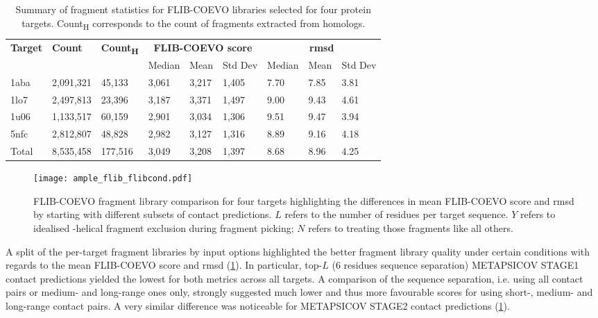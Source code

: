 \begin{table}[H]
  \centering
  \scriptsize
  \caption[FLIB-COEVO fragment characterics across four protein targets]{Summary of fragment statistics for FLIB-COEVO libraries selected for four protein targets. Count\textsubscript{H} corresponds to the count of fragments extracted from homologs.}
  \label{table:ample_flib_frag_summary}
  \begin{tabularx}{\textwidth}{X X X X X X X X X}
      \hline
      \multirow{2}{*}{\textbf{Target}} & \multirow{2}{*}{\textbf{Count}} & \multirow{2}{*}{\textbf{Count\textsubscript{H}}} & \multicolumn{3}{c}{\textbf{FLIB-COEVO score}} & \multicolumn{3}{c}{\textbf{\gls{rmsd}}} \\ \cline{4-9}
      		&			&			& Median 	& Mean 		& Std Dev 	& Median 	& Mean 	& Std Dev \\
      \hline
      1aba	& 2,091,321	& 45,133		& 3,061	& 3,217	& 1,405	& 7.70	& 7.85	& 3.81	\\
	  1lo7	& 2,497,813	& 23,396		& 3,187	& 3,371	& 1,497	& 9.00	& 9.43	& 4.61	\\
      1u06	& 1,133,517	& 60,159		& 2,901	& 3,034	& 1,306	& 9.51	& 9.47	& 3.94	\\
      5nfc	& 2,812,807	& 48,828		& 2,982	& 3,127	& 1,316	& 8.89	& 9.16	& 4.18	\\
      \hline
      Total	& 8,535,458	& 177,516		& 3,049	& 3,208	& 1,397	& 8.68	& 8.96	& 4.25	\\
      \hline
  \end{tabularx}
\end{table}

\begin{figure}[H]
	\centering
	\texttt{[image: ample\_flib\_flibcond.pdf]}
	\caption[FLIB-COEVO fragment library comparison]{FLIB-COEVO fragment library comparison for four targets highlighting the differences in mean FLIB-COEVO score and \gls{rmsd} by starting with different subsets of contact predictions. $L$ refers to the number of residues per target sequence. $Y$ refers to idealised \textalpha-helical fragment exclusion during fragment picking; $N$ refers to treating those fragments like all others.}
	\label{fig:ample_flib_flibcond}
\end{figure}

A split of the per-target fragment libraries by input options highlighted the better fragment library quality under certain conditions with regards to the mean FLIB-COEVO score and \gls{rmsd} (\cref{fig:ample_flib_flibcond}). In particular, top-$L$ (6 residues sequence separation) METAPSICOV STAGE1 contact predictions yielded the lowest for both metrics across all targets. A comparison of the sequence separation, i.e. using all contact pairs or medium- and long-range ones only, strongly suggested much lower and thus more favourable scores for using short-, medium- and long-range contact pairs. A very similar difference was noticeable for METAPSICOV STAGE2 contact predictions (\cref{fig:ample_flib_flibcond}). 

